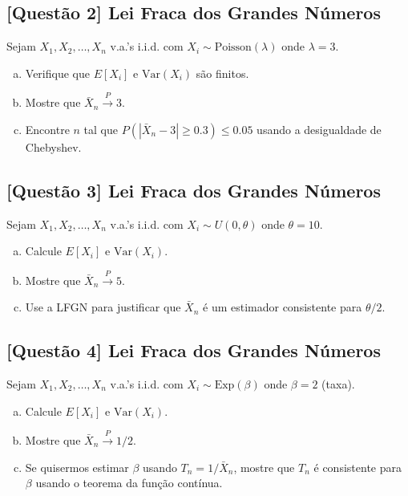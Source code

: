 \documentclass[12pt,a4paper]{article}
\begin{document}
\subsection*{[Questão 2] Lei Fraca dos Grandes Números}

Sejam $X_1, X_2, \ldots, X_n$ v.a.'s i.i.d. com $X_i \sim \text{Poisson}(\lambda)$ onde $\lambda = 3$.

\begin{enumerate}[(a)]
    \item Verifique que $E[X_i]$ e $\text{Var}(X_i)$ são finitos.
    \item Mostre que $\bar{X}_n \xrightarrow{P} 3$.
    \item Encontre $n$ tal que $P(|\bar{X}_n - 3| \geq 0.3) \leq 0.05$ usando a desigualdade de Chebyshev.
\end{enumerate}

\subsection*{[Questão 3] Lei Fraca dos Grandes Números}

Sejam $X_1, X_2, \ldots, X_n$ v.a.'s i.i.d. com $X_i \sim U(0, \theta)$ onde $\theta = 10$.

\begin{enumerate}[(a)]
    \item Calcule $E[X_i]$ e $\text{Var}(X_i)$.
    \item Mostre que $\bar{X}_n \xrightarrow{P} 5$.
    \item Use a LFGN para justificar que $\bar{X}_n$ é um estimador consistente para $\theta/2$.
\end{enumerate}

\subsection*{[Questão 4] Lei Fraca dos Grandes Números}

Sejam $X_1, X_2, \ldots, X_n$ v.a.'s i.i.d. com $X_i \sim \text{Exp}(\beta)$ onde $\beta = 2$ (taxa).

\begin{enumerate}[(a)]
    \item Calcule $E[X_i]$ e $\text{Var}(X_i)$.
    \item Mostre que $\bar{X}_n \xrightarrow{P} 1/2$.
    \item Se quisermos estimar $\beta$ usando $T_n = 1/\bar{X}_n$, mostre que $T_n$ é consistente para $\beta$ usando o teorema da função contínua.
\end{enumerate}
\end{document}
